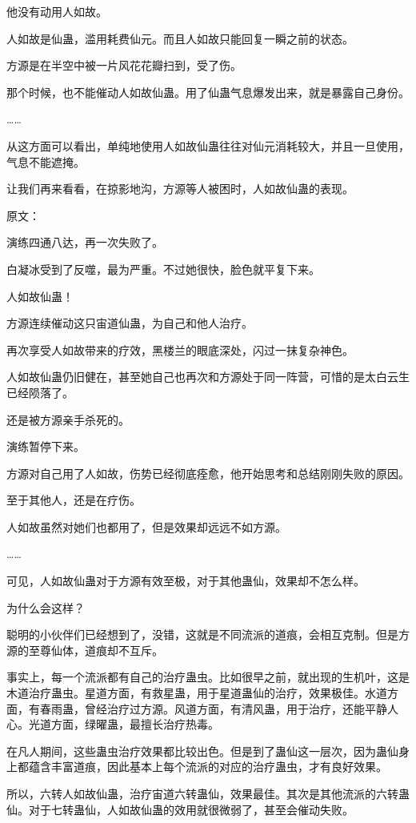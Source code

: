 \begin{this_body}
他没有动用人如故。

人如故是仙蛊，滥用耗费仙元。而且人如故只能回复一瞬之前的状态。

方源是在半空中被一片风花花瓣扫到，受了伤。

那个时候，也不能催动人如故仙蛊。用了仙蛊气息爆发出来，就是暴露自己身份。

……

从这方面可以看出，单纯地使用人如故仙蛊往往对仙元消耗较大，并且一旦使用，气息不能遮掩。

让我们再来看看，在掠影地沟，方源等人被困时，人如故仙蛊的表现。

原文：

演练四通八达，再一次失败了。

白凝冰受到了反噬，最为严重。不过她很快，脸色就平复下来。

人如故仙蛊！

方源连续催动这只宙道仙蛊，为自己和他人治疗。

再次享受人如故带来的疗效，黑楼兰的眼底深处，闪过一抹复杂神色。

人如故仙蛊仍旧健在，甚至她自己也再次和方源处于同一阵营，可惜的是太白云生已经陨落了。

还是被方源亲手杀死的。

演练暂停下来。

方源对自己用了人如故，伤势已经彻底痊愈，他开始思考和总结刚刚失败的原因。

至于其他人，还是在疗伤。

人如故虽然对她们也都用了，但是效果却远远不如方源。

……

可见，人如故仙蛊对于方源有效至极，对于其他蛊仙，效果却不怎么样。

为什么会这样？

聪明的小伙伴们已经想到了，没错，这就是不同流派的道痕，会相互克制。但是方源的至尊仙体，道痕却不互斥。

事实上，每一个流派都有自己的治疗蛊虫。比如很早之前，就出现的生机叶，这是木道治疗蛊虫。星道方面，有救星蛊，用于星道蛊仙的治疗，效果极佳。水道方面，有春雨蛊，曾经治疗过方源。风道方面，有清风蛊，用于治疗，还能平静人心。光道方面，绿曜蛊，最擅长治疗热毒。

在凡人期间，这些蛊虫治疗效果都比较出色。但是到了蛊仙这一层次，因为蛊仙身上都蕴含丰富道痕，因此基本上每个流派的对应的治疗蛊虫，才有良好效果。

所以，六转人如故仙蛊，治疗宙道六转蛊仙，效果最佳。其次是其他流派的六转蛊仙。对于七转蛊仙，人如故仙蛊的效用就很微弱了，甚至会催动失败。


\end{this_body}
